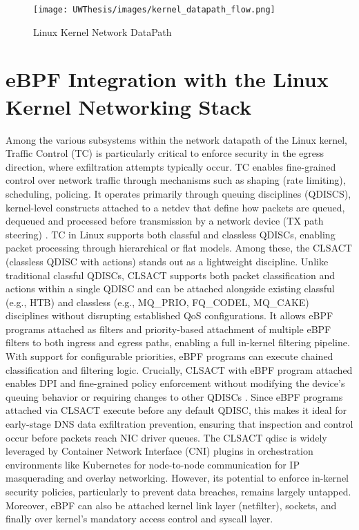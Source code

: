 \documentclass [11pt, proquest] {uwthesis}[2020/02/24]
\begin{document}
\label{sec:kernel-network-datapath}
\begin{figure}[h]
\texttt{[image: UWThesis/images/kernel\_datapath\_flow.png]}
\caption{Linux Kernel Network DataPath}
\end{figure}



\section{eBPF Integration with the Linux Kernel Networking Stack}
Among the various subsystems within the network datapath of the Linux kernel, Traffic Control (TC) is particularly critical to enforce security in the egress direction, where exfiltration attempts typically occur. TC enables fine-grained control over network traffic through mechanisms such as shaping (rate limiting), scheduling, policing. It operates primarily through queuing disciplines (QDISCS), kernel-level constructs attached to a netdev that define how packets are queued, dequeued and processed before transmission by a network device (TX path steering) \cite{salim2015linux}.
TC in Linux supports both classful and classless QDISCs, enabling packet processing through hierarchical or flat models. Among these, the CLSACT (classless QDISC with actions) stands out as a lightweight discipline. Unlike traditional classful QDISCs, CLSACT supports both packet classification and actions within a single QDISC and can be attached alongside existing classful (e.g., HTB) and classless (e.g., MQ\_PRIO, FQ\_CODEL, MQ\_CAKE) disciplines without disrupting established QoS configurations. It allows eBPF programs attached as filters and  priority-based attachment of multiple eBPF filters to both ingress and egress paths, enabling a full in-kernel filtering pipeline. With support for configurable priorities, eBPF programs can execute chained classification and filtering logic. Crucially, CLSACT with eBPF program attached enables DPI and fine-grained policy enforcement without modifying the device’s queuing behavior or requiring changes to other QDISCs \cite{borkmann2016getting}. Since eBPF programs attached via CLSACT execute before any default QDISC, this makes it ideal for early-stage DNS data exfiltration prevention, ensuring that inspection and control occur before packets reach NIC driver queues. The CLSACT qdisc is widely leveraged by Container Network Interface (CNI) plugins in orchestration environments like Kubernetes for node-to-node communication for IP masquerading and overlay networking. However, its potential to enforce in-kernel security policies, particularly to prevent data breaches, remains largely untapped. Moreover, eBPF can also be attached kernel link layer (netfilter), sockets, and finally over kernel's mandatory access control and syscall layer. 
\end{document}
